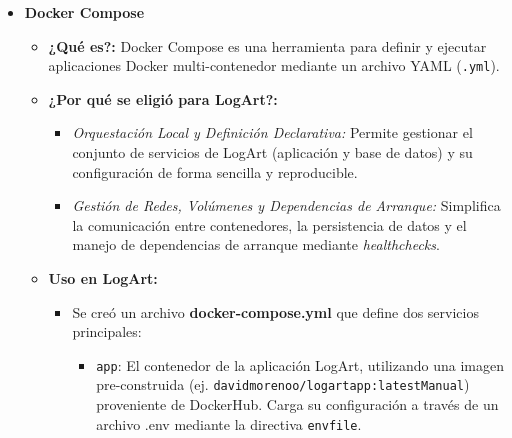 \begin{itemize}
\begin{itemize}
\begin{itemize}
\begin{itemize}
                            \end{itemize}
                        \item Este enfoque minimiza la superficie de ataque y el tamaño de la imagen desplegada. Las imágenes Docker de la aplicación se construyeron y etiquetaron para su uso local y para su publicación en DockerHub.
                    \end{itemize}
                \item \textbf{Versión:} Se utilizó Docker \textbf{v24.9} y se fue actualizando, cualquier versión superior debería funcionar.
            \end{itemize}
            \vspace{0.3cm}

            \item \textbf{Docker Compose}
                \begin{itemize}
                    \item \textbf{¿Qué es?:} Docker Compose es una herramienta para definir y ejecutar aplicaciones Docker multi-contenedor mediante un archivo YAML (\texttt{.yml}).
                    \item \textbf{¿Por qué se eligió para LogArt?:}
                        \begin{itemize}
                            \item \textit{Orquestación Local y Definición Declarativa:} Permite gestionar el conjunto de servicios de LogArt (aplicación y base de datos) y su configuración de forma sencilla y reproducible.
                            \item \textit{Gestión de Redes, Volúmenes y Dependencias de Arranque:} Simplifica la comunicación entre contenedores, la persistencia de datos y el manejo de dependencias de arranque mediante \textit{healthchecks}.
                        \end{itemize}
                    \item \textbf{Uso en LogArt:}
                        \begin{itemize}
                            \item Se creó un archivo \textbf{docker-compose.yml} que define dos servicios principales:
                                \begin{itemize}
                                    \item \texttt{app}: El contenedor de la aplicación LogArt, utilizando una imagen pre-construida (ej. \texttt{davidmorenoo/logartapp:latestManual}) proveniente de DockerHub. Carga su configuración a través de un archivo .env mediante la directiva \texttt{envfile}.
                                    

\end{itemize}
\end{itemize}
\end{itemize}
\end{itemize}
